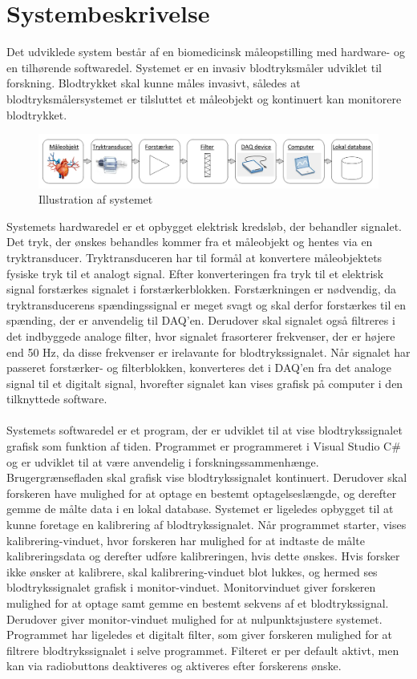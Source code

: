 \chapter{Systembeskrivelse}
Det udviklede system består af en biomedicinsk måleopstilling med hardware- og en tilhørende softwaredel. Systemet er en invasiv blodtryksmåler udviklet til forskning. Blodtrykket skal kunne måles invasivt, således at blodtryksmålersystemet er tilsluttet et måleobjekt og kontinuert kan monitorere blodtrykket. 

\begin{figure}[H]
	\centering
	\includegraphics[width=1\textwidth]{Figurer/Snip20151209_73}
	\caption{Illustration af systemet}
\end{figure}

Systemets hardwaredel er et opbygget elektrisk kredsløb, der behandler signalet. Det tryk, der ønskes behandles kommer fra et måleobjekt og hentes via en tryktransducer. Tryktransduceren har til formål at konvertere måleobjektets fysiske tryk til et analogt signal. Efter konverteringen fra tryk til et elektrisk signal forstærkes signalet i forstærkerblokken. Forstærkningen er nødvendig, da tryktransducerens spændingssignal er meget svagt og skal derfor forstærkes til en spænding, der er anvendelig til DAQ’en. Derudover skal signalet også filtreres i det indbyggede analoge filter, hvor signalet frasorterer frekvenser, der er højere end 50 Hz, da disse frekvenser er irelavante for blodtrykssignalet. Når signalet har passeret forstærker- og filterblokken, konverteres det i DAQ’en fra det analoge signal til et digitalt signal, hvorefter signalet kan vises grafisk på computer i den tilknyttede software. \\\\
Systemets softwaredel er et program, der er udviklet til at vise blodtrykssignalet grafisk som funktion af tiden. Programmet er programmeret i Visual Studio C\# og er udviklet til at være anvendelig i forskningssammenhænge. Brugergrænsefladen skal grafisk vise blodtrykssignalet kontinuert. Derudover skal forskeren have mulighed for at optage en bestemt optagelseslængde, og derefter gemme de målte data i en lokal database. Systemet er ligeledes opbygget til at kunne foretage en kalibrering af blodtrykssignalet. Når programmet starter, vises kalibrering-vinduet, hvor forskeren har mulighed for at indtaste de målte kalibreringsdata og derefter udføre kalibreringen, hvis dette ønskes. Hvis forsker ikke ønsker at kalibrere, skal kalibrering-vinduet blot lukkes, og hermed ses blodtrykssignalet grafisk i monitor-vinduet. Monitorvinduet giver forskeren mulighed for at optage samt gemme en bestemt sekvens af et blodtrykssignal. Derudover giver monitor-vinduet mulighed for at nulpunktsjustere systemet. Programmet har ligeledes et digitalt filter, som giver forskeren mulighed for at filtrere blodtrykssignalet i selve programmet. Filteret er per default aktivt, men kan via radiobuttons deaktiveres og aktiveres efter forskerens ønske. 